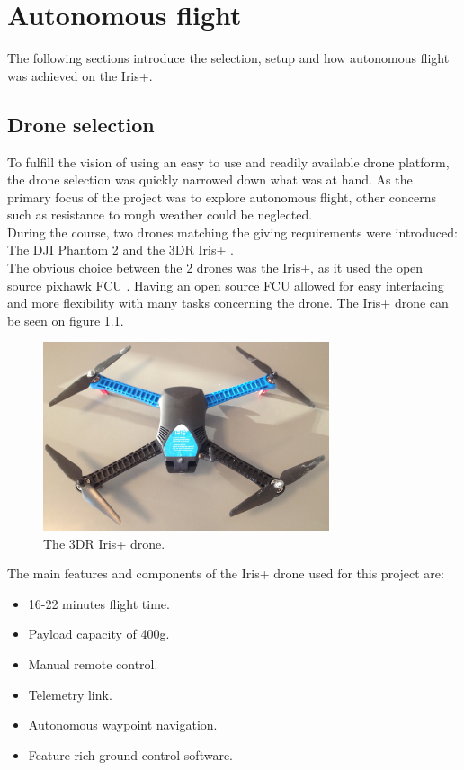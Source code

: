 \chapter{Autonomous flight}
The following sections introduce the selection, setup and how autonomous flight was achieved on
the Iris+.

\section{Drone selection}
To fulfill the vision of using an easy to use and readily available drone platform,
the drone selection was quickly narrowed down what was at hand. As the primary focus of the project was to
explore autonomous flight, other concerns such as resistance to rough weather could be neglected.
\\During the course, two drones matching the giving requirements were introduced: The DJI Phantom 2
\cite{Ref:dji} and the 3DR Iris+ \cite{Ref:3dr}.\\
The obvious choice between the 2 drones was the Iris+, as it used the open source pixhawk FCU
\cite{Ref:px4}. Having an open source FCU allowed for easy interfacing and more flexibility with
many tasks concerning the drone. The Iris+ drone can be seen on figure \ref{fig:iris}.
\\

\begin{figure}[H]
  \centering
    \includegraphics[width=0.75\textwidth]{./Images/iris}
  \caption{The 3DR Iris+ drone.}
  \label{fig:iris}
\end{figure}

\newpage

The main features and components of the Iris+ drone used for this project are:
\begin{itemize}
\item 16-22 minutes flight time.
\item Payload capacity of 400g.
\item Manual remote control.
\item Telemetry link.
\item Autonomous waypoint navigation.
\item Feature rich ground control software.
\end{itemize}



